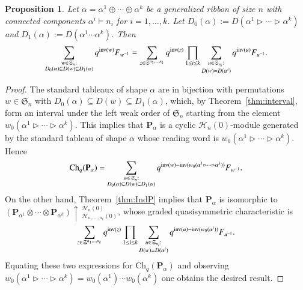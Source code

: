 \documentclass{amsart}
\newtheorem{proposition}[theorem]{Proposition}
\newtheorem*{Young's Rule}{Young's Rule}
\theoremstyle{definition}
\theoremstyle{remark}
\numberwithin{equation}{section}
\begin{document}
\begin{proposition}\label{prop:ChP}
Let $\alpha=\alpha^1\oplus\cdots\oplus\alpha^k$ be a generalized ribbon of size $n$ with connected components $\alpha^i\models n_i$ for $i=1,\ldots,k$. Let $D_0(\alpha) := D(\alpha^1\rhd\cdots\rhd\alpha^k)$ and $D_1(\alpha) := D(\alpha^1\cdots\alpha^k)$. Then
\[ \sum_{ \substack{w\in {{\mathfrak S}}_n: \\ D_0(\alpha)\subseteq D(w) \subseteq D_1(\alpha) }} q^{{{\rm inv}}(w)} F_{w^{-1}} = \sum_{z\in {{\mathfrak S}}^{n_1,\ldots,n_k}} q^{{{\rm inv}}(z)} \prod_{1\le i\le k} \sum_{ \substack{ u\in {{\mathfrak S}}_{n_i}: \\ D(w)=D(\alpha^i) }} q^{{{\rm inv}}(u)} F_{u^{-1}}. \]
\end{proposition}

\begin{proof}
The standard tableaux of shape $\alpha$ are in bijection with permutations $w\in{{\mathfrak S}}_n$ with $D_0(\alpha)\subseteq D(w) \subseteq D_1(\alpha)$, which, by Theorem~\ref{thm:interval}, form an interval under the left weak order of ${{\mathfrak S}}_n$ starting from the element $w_0(\alpha^1\rhd\cdots\rhd\alpha^k)$. This implies that ${\mathbf{P}}_\alpha$ is a cyclic ${\mathcal{H}}_n(0)$-module generated by the standard tableau of shape $\alpha$ whose reading word is $w_0(\alpha^1\rhd\cdots\rhd\alpha^k)$. Hence
\[ \mathrm{Ch}_q({\mathbf{P}}_\alpha) = \sum_{ \substack{ w\in {{\mathfrak S}}_n: \\ D_0(\alpha)\subseteq D(w) \subseteq D_1(\alpha) }} q^{{{\rm inv}}(w)-{{\rm inv}}(w_0(\alpha^1\rhd\cdots\rhd\alpha^k))} F_{w^{-1}}. \]
On the other hand, Theorem~\ref{thm:IndP} implies that ${\mathbf{P}}_\alpha$ is isomorphic to $\left({\mathbf{P}}_{\alpha^1}\otimes\cdots\otimes {\mathbf{P}}_{\alpha^k}\right) \uparrow\,_{{\mathcal{H}}_{n_1,\ldots,n_k}(0)}^{{\mathcal{H}}_n(0)}$, whose graded quasisymmetric characteristic is
\[ \sum_{z\in {{\mathfrak S}}^{n_1,\ldots,n_k}} q^{{{\rm inv}}(z)} \prod_{1\le i\le k} \sum_{ \substack{ u\in {{\mathfrak S}}_{n_i}: \\ D(w)=D(\alpha^i) }} q^{{{\rm inv}}(u)-{{\rm inv}}(w_0(\alpha^i))} F_{u^{-1}}. \]
Equating these two expressions for $\mathrm{Ch}_q({\mathbf{P}}_\alpha)$ and observing $w_0(\alpha^1\rhd\cdots\rhd\alpha^k) = w_0(\alpha^1)\cdots w_0(\alpha^k)$ one obtains the desired result.
\end{proof}
\end{document}
